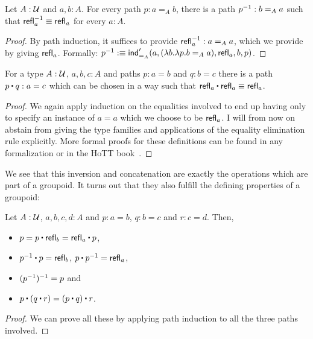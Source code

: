 \begin{defn}
Let $A : \mathcal{U}$ and $a, b : A$.
For every path $p : a =_A b$, there is a path $p^{-1} : b =_A a$ such that
$\mathsf{refl}_a^{-1} \equiv \mathsf{refl}_a$ for every $a : A$.
\end{defn}

\begin{proof}
By path induction, it suffices to provide $\mathsf{refl}_a^{-1} : a =_A a$, which we provide
by giving $\mathsf{refl}_a$. Formally:
$p^{-1} :\equiv \mathsf{ind}'_{=_A}(a, (\lambda b. \lambda p. b =_A a), \mathsf{refl}_a, b, p)$.
\end{proof}

\begin{defn}
For a type $A : \mathcal{U}$, $a, b, c : A$ and paths $p : a = b$ and $q : b = c$ there
is a path $p \ct q : a = c$ which can be chosen in a way such that
$\refl_a \ct \refl_a \equiv \refl_a$.
\end{defn}

\begin{proof}
We again apply induction on the equalities involved to end up having only to
specify an instance of $a = a$ which we choose to be $\mathsf{refl}_a$.
I will from now on abstain from giving the type families and applications
of the equality elimination rule explicitly.
More formal proofs for these definitions can be found in any formalization or
in the HoTT book~\cite{hottbook}.
\end{proof}

We see that this inversion and concatenation are exactly the operations which are
part of a groupoid.
It turns out that they also fulfill the defining properties of a groupoid:

\begin{defn}
Let $A : \mathcal{U}$, $a, b, c, d : A$ and $p : a = b$, $q : b = c$ and $r : c = d$.
Then,
\begin{itemize}
\item $p = p \ct \refl_b = \refl_a \ct p$,
\item $p\inv \ct p = \refl_b$, $p \ct p\inv = \refl_a$,
\item $(p^{-1})^{-1} = p$ and
\item $p \ct (q \ct r) = (p \ct q) \ct r$.
\end{itemize}
\end{defn}

\begin{proof}
We can prove all these by applying path induction to all the three paths involved.
\end{proof}

